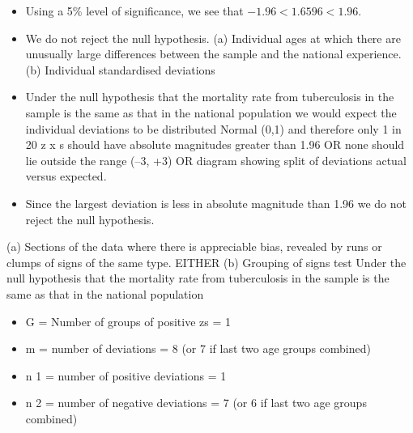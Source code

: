 \documentclass[a4paper,12pt]{article}
\begin{document}
\begin{enumerate}
\begin{itemize}
\item Using a 5\% level of significance, we see that $−1.96 < 1.6596 < 1.96$.
\item We do not reject the null hypothesis.
(a) Individual ages at which there are unusually large differences between the sample and the national experience.
(b) Individual standardised deviations
\item Under the null hypothesis that the mortality rate from tuberculosis in the sample is the same as that in the national population
we would expect the individual deviations to be distributed Normal (0,1) and therefore only 1 in 20 z x s should have absolute magnitudes greater than
1.96
OR
none should lie outside the range (–3, +3)
OR
diagram showing split of deviations actual versus expected.
\item Since the largest deviation is less in absolute magnitude than 1.96 we do not reject the null hypothesis.
\end{itemize}
(a)
Sections of the data where there is appreciable bias, revealed by runs or clumps of signs of the same type.
EITHER
(b)
Grouping of signs test
Under the null hypothesis that the mortality rate from tuberculosis in the
sample is the same as that in the national population
\begin{itemize}
\item G = Number of groups of positive zs = 1
\item m = number of deviations = 8 (or 7 if last two age groups combined)
\item n 1 = number of positive deviations = 1
\item n 2 = number of negative deviations = 7 (or 6 if last two age groups combined)
\end{itemize}


\end{enumerate}
\end{document}
